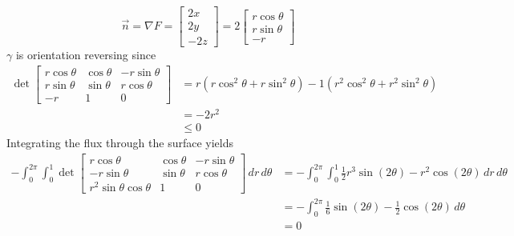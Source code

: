 \documentclass[12pt]{article}
\begin{document}
    \[
        \vec n 
        = \nabla F
        = \begin{bmatrix}
            2x \\ 2y \\ -2z
        \end{bmatrix}
        = 2 \begin{bmatrix}
            r\cos \theta \\
            r\sin \theta \\
            -r
        \end{bmatrix}
    \]
    $\gamma$ is orientation reversing since 
    \begin{align*}
        \det \begin{bmatrix}
            r\cos \theta & \cos \theta & -r\sin \theta \\
            r\sin \theta & \sin \theta & r\cos \theta\\
            -r & 1 & 0
        \end{bmatrix}
        &= r(r\cos^2 \theta + r\sin^2 \theta) - 1(r^2\cos^2 \theta + r^2\sin^2 \theta) \\
        &= -2r^2 \\
        &\leq 0
    \end{align*}
    Integrating the flux through the surface yields 
    \begin{align*}
        -\int_0^{2\pi} \int_0^1 
        \det \begin{bmatrix}
            r\cos \theta & \cos \theta & -r\sin \theta \\
            -r\sin \theta & \sin \theta & r\cos \theta\\
            r^2\sin \theta \cos \theta & 1 & 0
        \end{bmatrix}\,dr \,d\theta
        &= -\int_0^{2\pi} \int_0^1 
            \frac{1}{2}r^3\sin (2\theta)-r^2\cos (2\theta) \,dr \,d\theta \\
        &= -\int_0^{2\pi} 
            \frac{1}{6}\sin (2\theta)-\frac{1}{2}\cos (2\theta) \,d\theta \\
        &= 0
    \end{align*}
\end{document}

